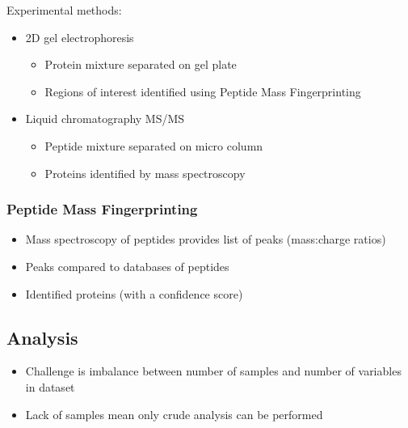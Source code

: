 \documentclass[a4paper]{article}
\begin{document}
Experimental methods:

\begin{itemize}
  \item
    2D gel electrophoresis

    \begin{itemize}
      \item
        Protein mixture separated on gel plate

      \item
        Regions of interest identified using Peptide Mass Fingerprinting
    \end{itemize}

  \item
    Liquid chromatography MS/MS

    \begin{itemize}
      \item
        Peptide mixture separated on micro column

      \item
        Proteins identified by mass spectroscopy
    \end{itemize}
\end{itemize}

\subsubsection{Peptide Mass Fingerprinting}

\begin{itemize}
  \item
    Mass spectroscopy of peptides provides list of peaks (mass:charge
    ratios)

  \item
    Peaks compared to databases of peptides

  \item
    Identified proteins (with a confidence score)
\end{itemize}

\subsection{Analysis}

\begin{itemize}
  \item
    Challenge is imbalance between number of samples and number of variables in
    dataset

  \item
    Lack of samples mean only crude analysis can be performed
\end{itemize}
\end{document}
